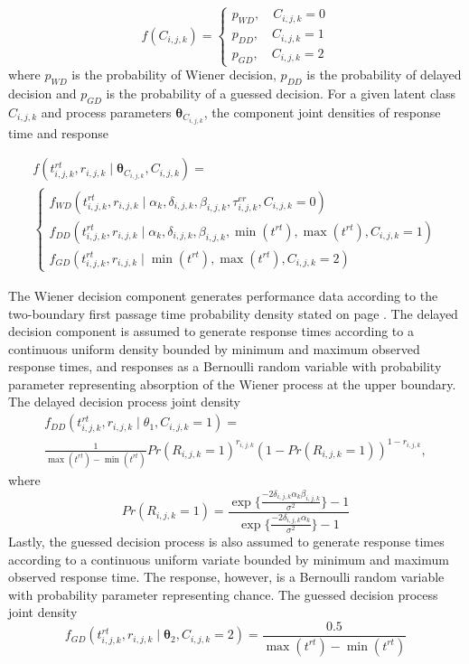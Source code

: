 \documentclass[12pt]{article}
\begin{document}
\begin{equation}
f(C_{i,j,k}) = 
\begin{cases}
p_{WD}, \quad C_{i,j,k} = 0 \\
p_{DD}, \quad C_{i,j,k} = 1 \\
p_{GD}, \quad C_{i,j,k} = 2
\end{cases}
\end{equation}
where ${p_{WD}}$ is the probability of Wiener decision, ${p_{DD}}$ is the probability of delayed decision and ${p_{GD}}$ is the probability of a guessed decision. For a given latent class $C_{i,j,k}$ and process parameters $\boldsymbol{\theta}_{C_{i,j,k}}$, the component joint densities of response time and response 

\begin{gather}
f(t_{i,j,k}^{rt},r_{i,j,k} \mid \boldsymbol{\theta}_{C_{i,j,k}}, C_{i,j,k}) = \nonumber \\
\begin{cases}
f_{WD}(t_{i,j,k}^{rt},r_{i,j,k} \mid \alpha_k,\delta_{i,j,k},\beta_{i,j,k},\tau_{i,j,k}^{er}, C_{i,j,k} = 0) \\
f_{DD}(t_{i,j,k}^{rt},r_{i,j,k} \mid \alpha_k,\delta_{i,j,k},\beta_{i,j,k},\operatorname{min}(t^{rt}),\operatorname{max}(t^{rt}), C_{i,j,k} = 1) \\
f_{GD}(t_{i,j,k}^{rt},r_{i,j,k} \mid \operatorname{min}(t^{rt}),\operatorname{max}(t^{rt}), C_{i,j,k} = 2)
\end{cases}
\end{gather}

	The Wiener decision component generates performance data according to the two-boundary first passage time probability density stated on page \pageref{eqn:wd}. The delayed decision component is assumed to generate response times according to a continuous uniform density bounded by minimum and maximum observed response times, and responses as a Bernoulli random variable with probability parameter representing absorption of the Wiener process at the upper boundary. The delayed decision process joint density
\begin{gather}
f_{DD}(t_{i,j,k}^{rt},r_{i,j,k} \mid \theta_1, C_{i,j,k} = 1) = \nonumber \\ 
\frac{1}{\operatorname{max}(t^{rt}) - \operatorname{min}(t^{rt})}Pr(R_{i,j,k}=1)^{r_{i,j,k}}(1-Pr(R_{i,j,k}=1))^{1-r_{i,j,k}},
\end{gather}
where
\begin{equation*}
Pr(R_{i,j,k}=1) = \frac{\operatorname{exp}                   \{\frac{-2\delta_{i,j,k} \alpha_k \beta_{i,j,k}}{\sigma^2}
\} - 1}{\operatorname{exp}\{
\frac{-2\delta_{i,j,k} \alpha_k}{\sigma^2}
\} - 1}
\end{equation*}
Lastly, the guessed decision process is also assumed to generate response times according to a continuous uniform variate bounded by minimum and maximum observed response time. The response, however, is a Bernoulli random variable with probability parameter representing chance. The guessed decision process joint density
\begin{equation}
f_{GD}(t_{i,j,k}^{rt},r_{i,j,k} \mid \boldsymbol{\theta}_2, C_{i,j,k} = 2) = \frac{0.5}{\operatorname{max}(t^{rt})-\operatorname{min}(t^{rt})}
\end{equation}
\end{document}
